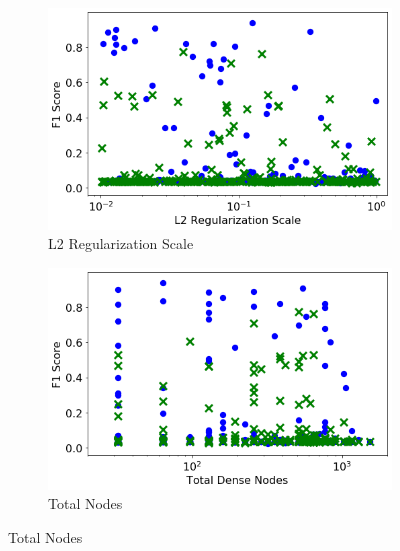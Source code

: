 \begin{figure}[H]
    \begin{subfigure}[b]{0.49\textwidth}
         \centering
         \includegraphics[width=\textwidth]{images/dnn_l2_reg.png}
         \caption{L2 Regularization Scale}
         \label{fig:dnn_l2_reg}
     \end{subfigure}
     \hfill
     \begin{subfigure}[b]{0.49\textwidth}
         \centering
         \includegraphics[width=\textwidth]{images/dnn_dense_nodes_total.png}
         \caption{Total Nodes}
         \label{fig:dnn_dense_nodes_total}
     \end{subfigure}     


\end{figure}
